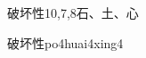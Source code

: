 \begin{entry}{破坏性}{10,7,8}{⽯、⼟、⼼}
  \begin{phonetics}{破坏性}{po4huai4xing4}
  \end{phonetics}
\end{entry}
